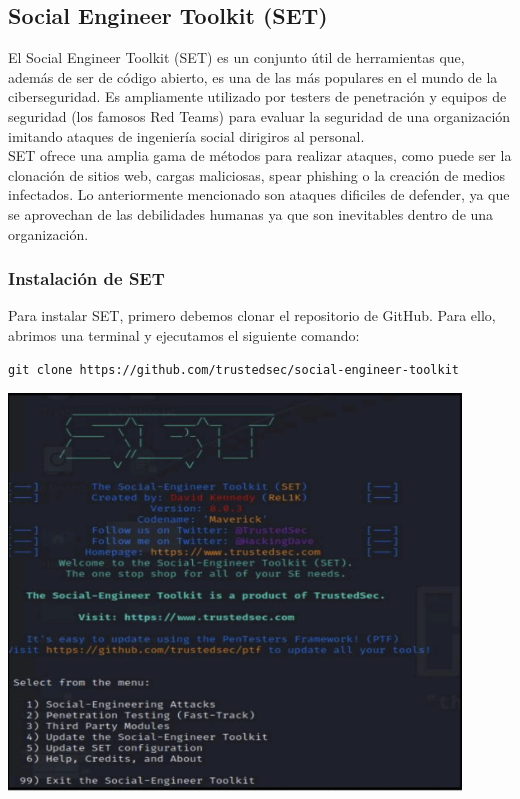\documentclass[12pt]{article}
\begin{document}
\subsection{Social Engineer Toolkit (SET)}
\noindent
El Social Engineer Toolkit (SET) es un conjunto útil de herramientas que, además de ser de código abierto, es una de las más populares en el mundo de la ciberseguridad. Es ampliamente utilizado por testers de penetración y equipos de seguridad (los famosos Red Teams) para evaluar la seguridad de una organización imitando ataques de ingeniería social dirigiros al personal.\\
SET ofrece una amplia gama de métodos para realizar ataques, como puede ser la clonación de sitios web, cargas maliciosas, spear phishing o la creación de medios infectados. Lo anteriormente mencionado son ataques dificiles de defender, ya que se aprovechan de las debilidades humanas ya que son inevitables dentro de una organización.
\subsubsection{Instalación de SET}
\noindent
Para instalar SET, primero debemos clonar el repositorio de GitHub. Para ello, abrimos una terminal y ejecutamos el siguiente comando:
\begin{framed}
\begin{verbatim}
git clone https://github.com/trustedsec/social-engineer-toolkit
\end{verbatim}
\end{framed}
\begin{center}
    \includegraphics[width=12cm]{set.png}
\end{center}
\end{document}
